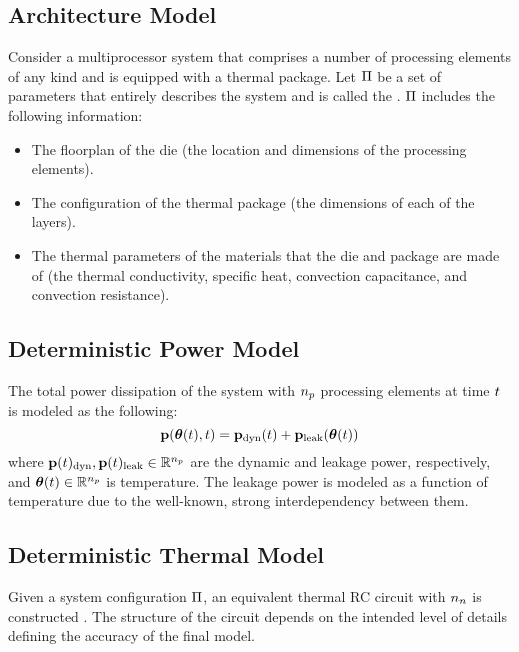 \subsection{Architecture Model}
Consider a multiprocessor system that comprises a number of processing elements of any kind and is equipped with a thermal package. Let $\Pi$ be a set of parameters that entirely describes the system and is called the . $\Pi$ includes the following information:
\begin{itemize}
  \item The floorplan of the die (the location and dimensions of the processing elements).
  \item The configuration of the thermal package (the dimensions of each of the layers).
  \item The thermal parameters of the materials that the die and package are made of (the thermal conductivity, specific heat, convection capacitance, and convection resistance).
\end{itemize}

\subsection{Deterministic Power Model} 
The total power dissipation of the system with ${n_p}$ processing elements at time $t$ is modeled as the following:
\[
  \vP(\vTO(\t), \t) = \vP_\dyn(\t) + \vP_\leak(\vTO(\t))
\]
where $\vP(\t)_\dyn, \vP(\t)_\leak \in \real^\cores$ are the dynamic and leakage power, respectively, and ${\boldsymbol\theta}(t) \in \mathbb{R}^{n_p}$ is temperature. The leakage power is modeled as a function of temperature due to the well-known, strong interdependency between them.

\subsection{Deterministic Thermal Model} 
Given a system configuration $\Pi$, an equivalent thermal RC circuit with ${n_n}$  is constructed \cite{kreith2000}. The structure of the circuit depends on the intended level of details defining the accuracy of the final model.

